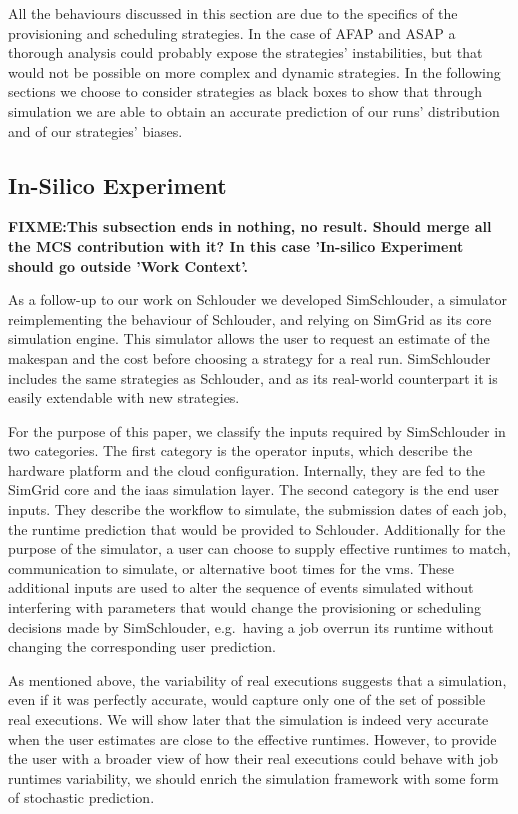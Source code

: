 \documentclass[10pt,conference,compsocconf]{IEEEtran}
\begin{document}
All the behaviours discussed in this section are due to the specifics of the
provisioning and scheduling strategies. In the case of AFAP and ASAP a thorough
analysis could probably expose the strategies' instabilities, but that would not
be possible on more complex and dynamic strategies. In the following sections we
choose to consider strategies as black boxes to show that through simulation 
we are able  to obtain an accurate prediction of our runs' distribution
and of our strategies' biases.




\subsection{In-Silico Experiment}
\textbf{FIXME:This subsection ends in nothing, no result. Should merge
all the MCS contribution with it? In this case 'In-silico Experiment should
go outside 'Work Context'.} 

As a follow-up  to our work on Schlouder we  developed SimSchlouder, a simulator
reimplementing the  behaviour of Schlouder, and  relying on SimGrid as  its core
simulation engine.  This simulator allows the user to request an estimate of the
makespan and  the cost before choosing  a strategy for a  real run. SimSchlouder
includes the same strategies as Schlouder,  and as its real-world counterpart it
is easily extendable with new strategies. 

For the purpose of this paper, we classify the inputs required by SimSchlouder
in two categories. The first category is the operator inputs, which describe the
hardware platform and the cloud configuration. Internally, they are fed to the
SimGrid core and the \ac{iaas} simulation layer. The second category is the end
user inputs. They describe the workflow to simulate, the submission dates of
each job, the runtime prediction that would be provided to Schlouder.
Additionally for the purpose of the simulator, a user can choose to supply
effective runtimes to match, communication to simulate, or alternative boot
times for the \acp{vm}. These additional inputs are used to alter the sequence
of events simulated without interfering with parameters that would change the
provisioning or scheduling decisions made by SimSchlouder, e.g.\ having a job
overrun its runtime without changing the corresponding user prediction.

As mentioned above, the variability of real executions suggests that a simulation,
even if it was  perfectly accurate, would capture only one of the set
of possible real executions. We will show later that  the simulation is indeed
very   accurate  when   the  user   estimates  are   close  to   the  effective
runtimes. However,  to  provide the user  with a broader view  of how
their real executions could behave with job runtimes variability,  we should 
enrich the simulation framework with some form of stochastic prediction.
\end{document}
